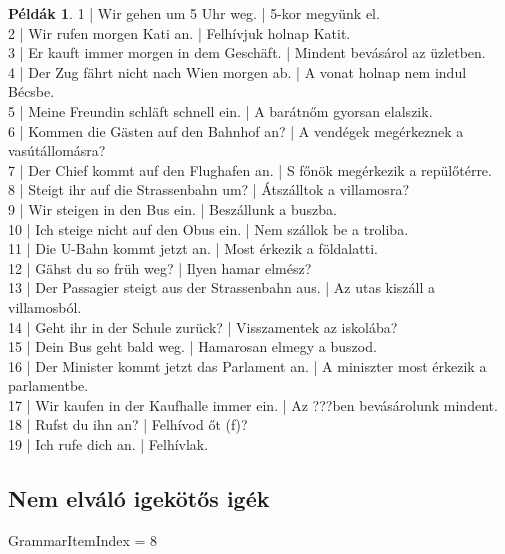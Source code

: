 \documentclass{article}
\theoremstyle{definition}
\newtheorem*{exmp}{Példák}
\begin{document}
\begin{exmp}
1 | Wir gehen um 5 Uhr weg. | 5-kor megyünk el.\\
2 | Wir rufen morgen Kati an. | Felhívjuk holnap Katit.\\
3 | Er kauft immer morgen in dem Geschäft. | Mindent bevásárol az üzletben.\\
4 | Der Zug fährt nicht nach Wien morgen ab. | A  vonat holnap nem indul Bécsbe.\\
5 | Meine Freundin schläft schnell ein. | A barátnőm gyorsan elalszik.\\
6 | Kommen die Gästen auf den Bahnhof an? | A vendégek megérkeznek a vasútállomásra?\\
7 | Der Chief kommt auf den Flughafen an. | S főnök megérkezik a repülőtérre.\\
8 | Steigt ihr auf die Strassenbahn um? | Átszálltok a villamosra?\\
9 | Wir steigen in den Bus ein. | Beszállunk a buszba.\\
10 | Ich steige nicht auf den Obus ein. | Nem szállok be a troliba.\\
11 | Die U-Bahn kommt jetzt an. | Most érkezik a földalatti.\\
12 | Gähst du so früh weg? | Ilyen hamar elmész?\\
13 | Der Passagier steigt aus der Strassenbahn aus. | Az utas kiszáll a villamosból.\\
14 | Geht ihr in der Schule zurück? | Visszamentek az iskolába?\\
15 | Dein Bus geht bald weg. | Hamarosan elmegy a buszod.\\
16 | Der Minister kommt jetzt das Parlament an. | A miniszter most érkezik a parlamentbe.\\
17 | Wir kaufen in der Kaufhalle immer ein. | Az ???ben bevásárolunk mindent.\\
18 | Rufst du ihn an? | Felhívod őt (f)?\\
19 | Ich rufe dich an. | Felhívlak.\\
\end{exmp}

\subsection{Nem elváló igekötős igék}

GrammarItemIndex = 8
\end{document}
